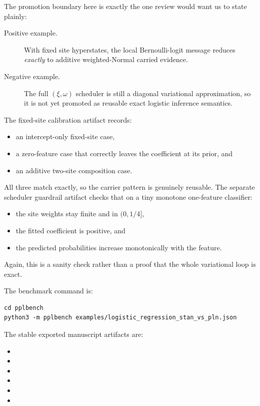 \documentclass[11pt,openany]{report}
\begin{document}
The promotion boundary here is exactly the one review would want us to
state plainly:
\begin{description}
\item[Positive example.] With fixed site hyperstates, the local Bernoulli-logit
message reduces \emph{exactly} to additive weighted-Normal carried evidence.
\item[Negative example.] The full \((\xi, \omega)\) scheduler is still a
diagonal variational approximation, so it is not yet promoted as reusable exact
logistic inference semantics.
\end{description}

The fixed-site calibration artifact
records:
\begin{itemize}
\item an intercept-only fixed-site case,
\item a zero-feature case that correctly leaves the coefficient at its prior,
and
\item an additive two-site composition case.
\end{itemize}
All three match exactly, so the carrier pattern is genuinely reusable.  The
separate scheduler guardrail artifact
checks that on a tiny monotone one-feature classifier:
\begin{itemize}
\item the site weights stay finite and in \((0, 1/4]\),
\item the fitted coefficient is positive, and
\item the predicted probabilities increase monotonically with the feature.
\end{itemize}
Again, this is a sanity check rather than a proof that the whole variational
loop is exact.

The benchmark command is:
\begin{lstlisting}
cd pplbench
python3 -m pplbench examples/logistic_regression_stan_vs_pln.json
\end{lstlisting}

The stable exported manuscript artifacts are:
\begin{itemize}
\item {}
\item {}
\item {}
\item {}
\item {}
\item {}
\end{itemize}
\end{document}
